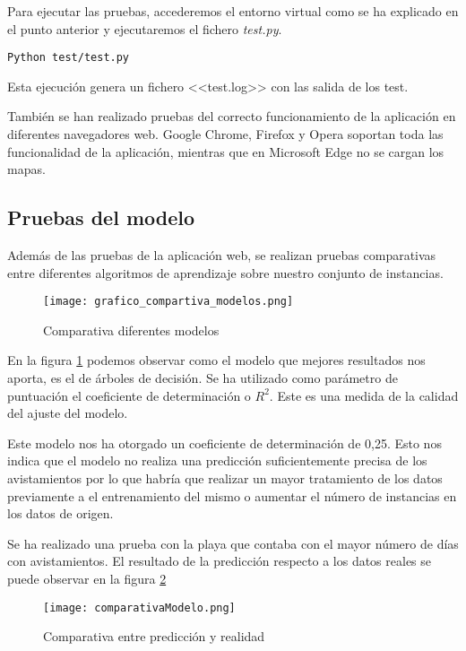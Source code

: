 Para ejecutar las pruebas, accederemos el entorno virtual como se ha explicado en el punto anterior y ejecutaremos el fichero \emph{test.py}.
\begin{verbatim}
Python test/test.py
\end{verbatim}

Esta ejecución genera un fichero <<test.log>> con las salida de los test.

También se han realizado pruebas del correcto funcionamiento de la aplicación en diferentes navegadores web. Google Chrome, Firefox y Opera soportan toda las funcionalidad de la aplicación, mientras que en Microsoft Edge no se cargan los mapas.\label{pruebas_navegadores}

\subsection{Pruebas del modelo}

Además de las pruebas de la aplicación web, se realizan pruebas comparativas entre diferentes algoritmos de aprendizaje sobre nuestro conjunto de instancias.

\begin{figure}[!h]
	\centering
	\texttt{[image: grafico\_compartiva\_modelos.png]}
	\caption{Comparativa diferentes modelos}\label{fig:comparativa_modelos}
\end{figure}

En la figura \ref{fig:comparativa_modelos} podemos observar como el modelo que mejores resultados nos aporta, es el de árboles de decisión. Se ha utilizado como parámetro de puntuación el coeficiente de determinación o \(R^2\). Este es una medida de la calidad del ajuste del modelo.

Este modelo nos ha otorgado un coeficiente de determinación de 0,25. Esto nos indica que el modelo no realiza una predicción suficientemente precisa de los avistamientos por lo que habría que realizar un mayor tratamiento de los datos previamente a el entrenamiento del mismo o aumentar el número de instancias en los datos de origen.

Se ha realizado una prueba con la playa que contaba con el mayor número de días con avistamientos. El resultado de la predicción respecto a los datos reales se puede observar en la figura \ref{fig:comparativa}
 
\begin{figure}[!h]
	\centering
	\texttt{[image: comparativaModelo.png]}
	\caption{Comparativa entre predicción y realidad}\label{fig:comparativa}
\end{figure}